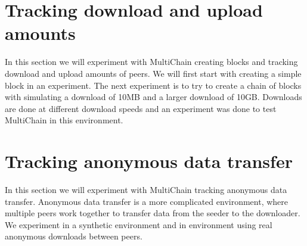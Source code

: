 

\section{Tracking download and upload amounts}
In this section we will experiment with MultiChain creating blocks and tracking download and upload amounts of peers.
We will first start with creating a simple block in an experiment.
The next experiment is to try to create a chain of blocks with simulating a download of 10MB
and a larger download of 10GB.
Downloads are done at different download speeds and an experiment was done to test MultiChain in this environment.





\section{Tracking anonymous data transfer}
In this section we will experiment with MultiChain tracking anonymous data transfer.
Anonymous data transfer is a more complicated environment,
where multiple peers work together to transfer data from the seeder to the downloader.
We experiment in a synthetic environment and in environment using real anonymous downloads between peers.






